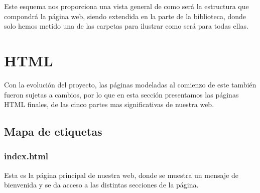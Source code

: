 \documentclass{article}
\begin{document}
Este esquema nos proporciona una vista general de como será la estructura que compondrá la página web, siendo extendida en la parte de la biblioteca, donde solo hemos metido una de las carpetas para ilustrar como será para todas ellas.

\newpage

\section{HTML}

Con la evolución del proyecto, las páginas modeladas al comienzo de este también fueron sujetas a cambios, por lo que en esta sección presentamos las páginas HTML finales, de las cinco partes mas significativas de nuestra web.

\subsection{Mapa de etiquetas}

\subsubsection*{index.html}

Esta es la página principal de nuestra web, donde se muestra un mensaje de bienvenida y se da acceso a las distintas secciones de la página.
\end{document}

